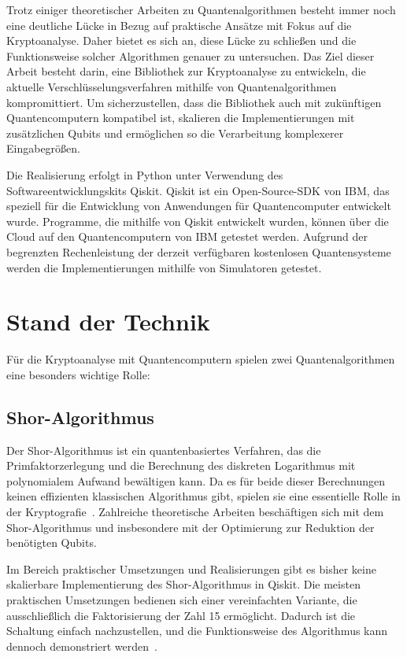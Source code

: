 \documentclass[
  a4paper, %
  10pt, %
  unnumberedsections, %
  twoside, %
]{LTJournalArticle}
\begin{document}
Trotz einiger theoretischer Arbeiten zu Quantenalgorithmen
besteht immer noch eine deutliche Lücke in Bezug auf praktische Ansätze mit Fokus auf die Kryptoanalyse.
Daher bietet es sich an, diese Lücke zu schließen und die Funktionsweise solcher Algorithmen genauer zu untersuchen.
Das Ziel dieser Arbeit besteht darin, eine Bibliothek zur Kryptoanalyse zu entwickeln,
die aktuelle Verschlüsselungsverfahren mithilfe von Quantenalgorithmen kompromittiert.
Um sicherzustellen, dass die Bibliothek auch mit zukünftigen Quantencomputern kompatibel ist,
skalieren die Implementierungen mit zusätzlichen Qubits und
ermöglichen so die Verarbeitung komplexerer Eingabegrößen.

Die Realisierung erfolgt in Python unter Verwendung des Softwareentwicklungskits Qiskit.
Qiskit ist ein Open-Source-SDK von IBM,
das speziell für die Entwicklung von Anwendungen für Quantencomputer entwickelt wurde.
Programme, die mithilfe von Qiskit entwickelt wurden,
können über die Cloud auf den Quantencomputern von IBM getestet werden.
Aufgrund der begrenzten Rechenleistung der derzeit verfügbaren kostenlosen Quantensysteme
werden die Implementierungen mithilfe von Simulatoren getestet.



\section{Stand der Technik}

Für die Kryptoanalyse mit Quantencomputern spielen zwei Quantenalgorithmen eine besonders wichtige Rolle:

\subsection{Shor-Algorithmus}
Der Shor-Algorithmus ist ein quantenbasiertes Verfahren,
das die Primfaktorzerlegung und die Berechnung des diskreten Logarithmus
mit polynomialem Aufwand bewältigen kann.
Da es für beide dieser Berechnungen keinen effizienten klassischen Algorithmus gibt,
spielen sie eine essentielle Rolle in der Kryptografie~\autocite{Shor:1997}.
Zahlreiche theoretische Arbeiten beschäftigen sich mit dem Shor-Algorithmus und
insbesondere mit der Optimierung zur Reduktion der benötigten Qubits.

Im Bereich praktischer Umsetzungen und Realisierungen
gibt es bisher keine skalierbare Implementierung des Shor-Algorithmus in Qiskit.
Die meisten praktischen Umsetzungen bedienen sich einer vereinfachten Variante,
die ausschließlich die Faktorisierung der Zahl 15 ermöglicht.
Dadurch ist die Schaltung einfach nachzustellen,
und die Funktionsweise des Algorithmus kann dennoch demonstriert werden~\autocite{9376169, Monz_2016, IBM:Shor}.
\end{document}
